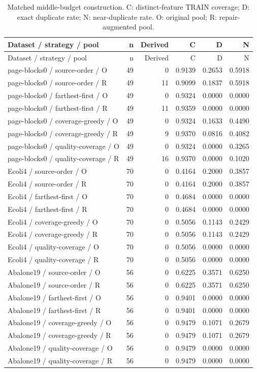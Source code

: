 \begin{longtable}{lrrrrr}
\caption{Matched middle-budget construction. C: distinct-feature TRAIN coverage; D: exact duplicate rate; N: near-duplicate rate. O: original pool; R: repair-augmented pool.}\label{tab:coverage}\\
\toprule
Dataset / strategy / pool & n & Derived & C & D & N \\
\midrule
\endfirsthead
\toprule
Dataset / strategy / pool & n & Derived & C & D & N \\
\midrule
\endhead
page-blocks0 / source-order / O & 49 & 0 & 0.9139 & 0.2653 & 0.5918 \\
page-blocks0 / source-order / R & 49 & 11 & 0.9099 & 0.1837 & 0.5918 \\
page-blocks0 / farthest-first / O & 49 & 0 & 0.9324 & 0.0000 & 0.0000 \\
page-blocks0 / farthest-first / R & 49 & 11 & 0.9359 & 0.0000 & 0.0000 \\
page-blocks0 / coverage-greedy / O & 49 & 0 & 0.9324 & 0.1633 & 0.4490 \\
page-blocks0 / coverage-greedy / R & 49 & 9 & 0.9370 & 0.0816 & 0.4082 \\
page-blocks0 / quality-coverage / O & 49 & 0 & 0.9324 & 0.0000 & 0.3265 \\
page-blocks0 / quality-coverage / R & 49 & 16 & 0.9370 & 0.0000 & 0.1020 \\
Ecoli4 / source-order / O & 70 & 0 & 0.4164 & 0.2000 & 0.3857 \\
Ecoli4 / source-order / R & 70 & 0 & 0.4164 & 0.2000 & 0.3857 \\
Ecoli4 / farthest-first / O & 70 & 0 & 0.4684 & 0.0000 & 0.0000 \\
Ecoli4 / farthest-first / R & 70 & 0 & 0.4684 & 0.0000 & 0.0000 \\
Ecoli4 / coverage-greedy / O & 70 & 0 & 0.5056 & 0.1143 & 0.2429 \\
Ecoli4 / coverage-greedy / R & 70 & 0 & 0.5056 & 0.1143 & 0.2429 \\
Ecoli4 / quality-coverage / O & 70 & 0 & 0.5056 & 0.0000 & 0.0000 \\
Ecoli4 / quality-coverage / R & 70 & 0 & 0.5056 & 0.0000 & 0.0000 \\
Abalone19 / source-order / O & 56 & 0 & 0.6225 & 0.3571 & 0.6250 \\
Abalone19 / source-order / R & 56 & 0 & 0.6225 & 0.3571 & 0.6250 \\
Abalone19 / farthest-first / O & 56 & 0 & 0.9401 & 0.0000 & 0.0000 \\
Abalone19 / farthest-first / R & 56 & 0 & 0.9401 & 0.0000 & 0.0000 \\
Abalone19 / coverage-greedy / O & 56 & 0 & 0.9479 & 0.1071 & 0.2679 \\
Abalone19 / coverage-greedy / R & 56 & 0 & 0.9479 & 0.1071 & 0.2679 \\
Abalone19 / quality-coverage / O & 56 & 0 & 0.9479 & 0.0000 & 0.0000 \\
Abalone19 / quality-coverage / R & 56 & 0 & 0.9479 & 0.0000 & 0.0000 \\
\bottomrule
\end{longtable}
